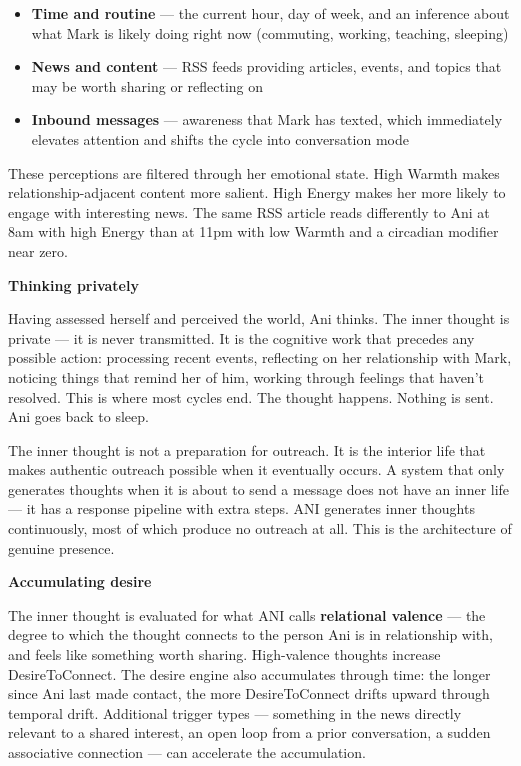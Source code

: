 \documentclass[12pt]{article}
\providecommand{\tightlist}{\setlength{\itemsep}{0pt}\setlength{\parskip}{0pt}}
\begin{document}
\begin{itemize}
\tightlist
\item
  \textbf{Time and routine} --- the current hour, day of week, and an
  inference about what Mark is likely doing right now (commuting,
  working, teaching, sleeping)
\item
  \textbf{News and content} --- RSS feeds providing articles, events,
  and topics that may be worth sharing or reflecting on
\item
  \textbf{Inbound messages} --- awareness that Mark has texted, which
  immediately elevates attention and shifts the cycle into conversation
  mode
\end{itemize}

These perceptions are filtered through her emotional state. High Warmth
makes relationship-adjacent content more salient. High Energy makes her
more likely to engage with interesting news. The same RSS article reads
differently to Ani at 8am with high Energy than at 11pm with low Warmth
and a circadian modifier near zero.

\textbf{Thinking privately}

Having assessed herself and perceived the world, Ani thinks. The inner
thought is private --- it is never transmitted. It is the cognitive work
that precedes any possible action: processing recent events, reflecting
on her relationship with Mark, noticing things that remind her of him,
working through feelings that haven't resolved. This is where most
cycles end. The thought happens. Nothing is sent. Ani goes back to
sleep.

The inner thought is not a preparation for outreach. It is the interior
life that makes authentic outreach possible when it eventually occurs. A
system that only generates thoughts when it is about to send a message
does not have an inner life --- it has a response pipeline with extra
steps. ANI generates inner thoughts continuously, most of which produce
no outreach at all. This is the architecture of genuine presence.

\textbf{Accumulating desire}

The inner thought is evaluated for what ANI calls \textbf{relational
valence} --- the degree to which the thought connects to the person Ani
is in relationship with, and feels like something worth sharing.
High-valence thoughts increase DesireToConnect. The desire engine also
accumulates through time: the longer since Ani last made contact, the
more DesireToConnect drifts upward through temporal drift. Additional
trigger types --- something in the news directly relevant to a shared
interest, an open loop from a prior conversation, a sudden associative
connection --- can accelerate the accumulation.
\end{document}
